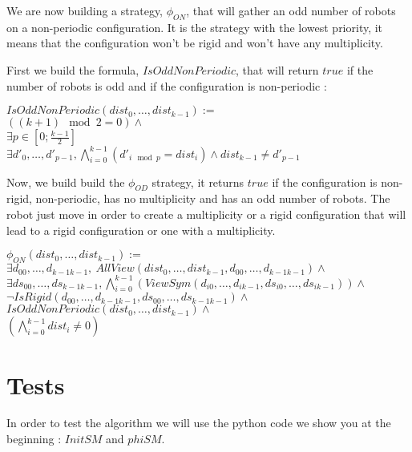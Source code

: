 \documentclass{article}
\begin{document}
We are now building a strategy, $\phi_{ON}$, that will gather an odd number of robots on a non-periodic configuration. It is the strategy with the lowest priority, it means that the configuration won't be rigid and won't have any multiplicity.

First we build the formula, $IsOddNonPeriodic$, that will return $true$ if the number of robots is odd and if the configuration is non-periodic :

\begin{center}
    
$IsOddNonPeriodic(dist_{0}, \ldots , dist_{k-1}):=$\\
$((k+1) \mod{2} = 0) \land $\\
$\exists p \in [0; \frac{k-1}{2}]$\\
$\exists d'_{0}, \ldots , d'_{p-1}, \bigwedge_{i=0}^{k-1} (d'_{i\mod{p}} = dist_{i}) \land dist_{k-1} \not= d'_{p-1}$
\end{center}

Now, we build build the $\phi_{OD}$ strategy, it returns $true$ if the configuration is non-rigid, non-periodic, has no multiplicity and has an odd number of robots. The robot just move in order to create a multiplicity or a rigid configuration that will lead to a rigid configuration or one with a multiplicity.

\begin{center}
    
$\phi_{ON}(dist_{0}, \ldots , dist_{k-1}):=$\\
$\exists d_{00}, \ldots ,d_{k-1k-1},\ AllView(dist_{0}, \ldots ,dist_{k-1}, d_{00}, \ldots ,d_{k-1k-1})\land$\\
$\exists ds_{00}, \ldots ,ds_{k-1k-1}, \bigwedge_{i=0}^{k-1} (ViewSym(d_{i0}, \ldots , d_{ik-1}, ds_{i0}, \ldots , ds_{ik-1}))\land$\\
$\lnot IsRigid(d_{00}, \ldots ,d_{k-1k-1}, ds_{00}, \ldots ,ds_{k-1k-1}) \land $\\
$IsOddNonPeriodic(dist_{0}, \ldots , dist_{k-1}) \land $\\
$(\bigwedge_{i=0}^{k-1} dist_{i} \not= 0)$
\end{center}

\section{Tests}

In order to test the algorithm \cite{algo} we will use the python code we show you at the beginning : $InitSM$ and $phiSM$.
\end{document}
